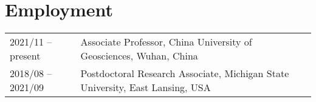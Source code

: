 \section*{Employment}

\begin{tabular}{p{} p{}}
2021/11 -- present & Associate Professor,
					 China University of Geosciences, Wuhan, China \\
2018/08 -- 2021/09 & Postdoctoral Research Associate,
	                 Michigan State University, East Lansing, USA \\
\end{tabular}
